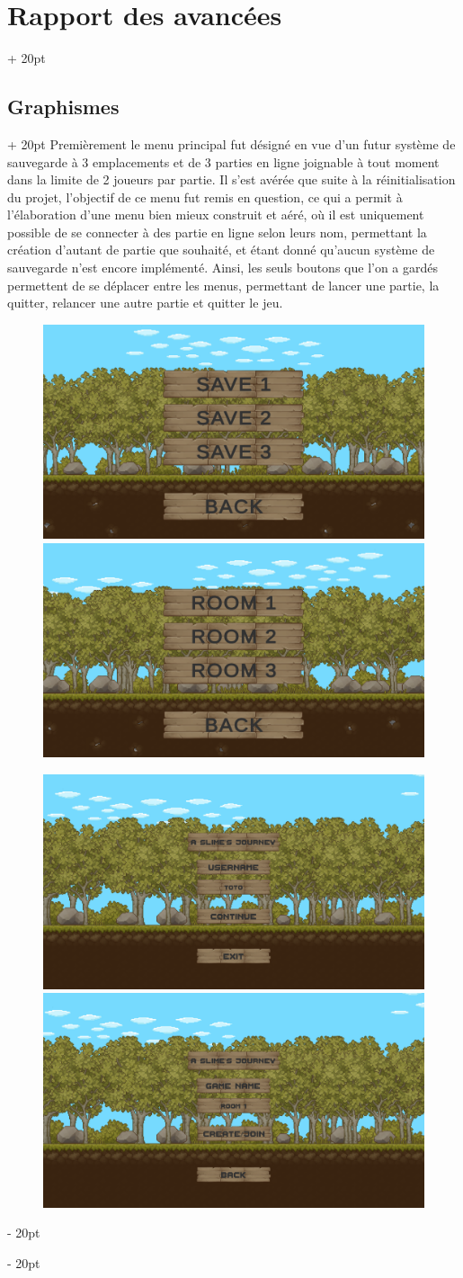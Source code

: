 \documentclass[a4paper, 12pt, twoside]{article}
\newcommand{\ind}[1][20pt]{\advance\leftskip + #1}
\newcommand{\deind}[1][20pt]{\advance\leftskip - #1}
\newenvironment{indt}[2][20pt]{#2 \par \ind[#1]}{\par \deind} %
\begin{document}
\begin{indt}{\section{Rapport des avancées}}
\begin{indt}{\subsection{Graphismes}}
            Premièrement le menu principal fut désigné en vue d'un futur système de sauvegarde à 3 emplacements et de 3 parties en ligne joignable à tout moment dans la limite de 2 joueurs par partie. Il s'est avérée que suite à la réinitialisation du projet, l'objectif de ce menu fut remis en question, ce qui a permit à l'élaboration d'une menu bien mieux construit et aéré, où il est uniquement possible de se connecter à des partie en ligne selon leurs nom, permettant la création d'autant de partie que souhaité, et étant donné qu'aucun système de sauvegarde n'est encore implémenté. Ainsi, les seuls boutons que l'on a gardés permettent de se déplacer entre les menus, permettant de lancer une partie, la quitter, relancer une autre partie et quitter le jeu.

            \begin{figure}
                \includegraphics[width=0.49\linewidth]{MMV12.png}\hfill \hfill\includegraphics[width=0.49\linewidth]{MMV13.png}
            \end{figure}

            \begin{figure}
                \includegraphics[width=0.49\linewidth]{MMV22.png}\hfill \hfill\includegraphics[width=0.49\linewidth]{MMV23.png}
            \end{figure}


\end{indt}
\end{indt}
\end{document}

